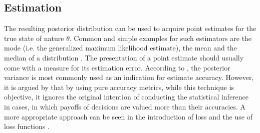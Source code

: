         \subsection{Estimation}
        The resulting posterior distribution can be used to acquire point estimates for the true state of nature $\theta$. Common and simple examples for such estimators are the mode (i.e. the generalized maximum likelihood estimate), the mean and the median of a distribution \citep{berger2013stat}. The presentation of a point estimate should usually come with a measure for its estimation error. According to \citet{berger2013stat}, the posterior variance is most commonly used as an indication for estimate accuracy. However, it is argued by \citet{davidson2015} that by using pure accuracy metrics, while this technique is objective, it ignores the original intention of conducting the statistical inference in cases, in which payoffs of decisions are valued more than their accuracies. A more appropriate approach can be seen in the introduction of loss and the use of loss functions \citep{davidson2015}.
        
